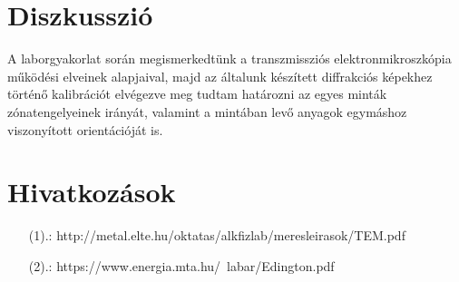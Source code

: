 \documentclass[12pt,a4paper]{article}
\begin{document}
\section{Diszkusszió}
\hspace*{10pt} A laborgyakorlat során megismerkedtünk a transzmissziós elektronmikroszkópia működési elveinek alapjaival, majd az általunk készített diffrakciós képekhez történő kalibrációt elvégezve meg tudtam határozni az egyes minták zónatengelyeinek irányát, valamint a mintában levő anyagok egymáshoz viszonyított orientációját is.

\section*{Hivatkozások}
\begin{itemize}
\item[(1).:] {http://metal.elte.hu/oktatas/alkfizlab/meresleirasok/TEM.pdf}
\item[(2).:] {https://www.energia.mta.hu/~labar/Edington.pdf}
\end{itemize}
\end{document}
